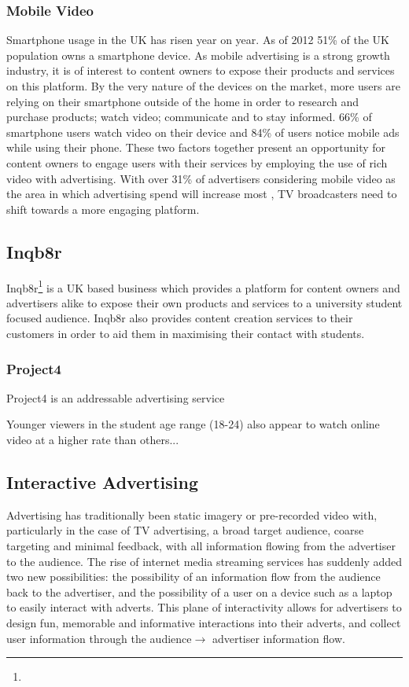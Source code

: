 	\subsubsection{Mobile Video}

	Smartphone usage in the UK has risen year on year. As of 2012 51\% of the UK population owns a smartphone device. As mobile advertising is a strong growth industry, it is of interest to content owners to expose their products and services on this platform. By the very nature of the devices on the market, more users are relying on their smartphone outside of the home in order to research and purchase products; watch video; communicate and to stay informed. 66\% of smartphone users watch video on their device and 84\% of users notice mobile ads while using their phone. \citep{mobile-planet} These two factors together present an opportunity for content owners to engage users with their services by employing the use of rich video with advertising. With over 31\% of advertisers considering mobile video as the area in which advertising spend will increase most \citep{brightroll-report}, TV broadcasters need to shift towards a more engaging platform.


	\subsection{Inqb8r}

	Inqb8r\footnote{} is a UK based business which provides a platform for content owners and advertisers alike to expose their own products and services to a university student focused audience. Inqb8r also provides content creation services to their customers in order to aid them in maximising their contact with students.

	\subsubsection{Project4}

	Project4 is an addressable advertising service

	Younger viewers in the student age range (18-24) also appear to watch online video at a higher rate than others...


	\subsection{Interactive Advertising}

	Advertising has traditionally been static imagery or pre-recorded video with, particularly in the case of TV advertising, a broad target audience, coarse targeting and minimal feedback, with all information flowing from the advertiser to the audience. The rise of internet media streaming services has suddenly added two new possibilities: the possibility of an information flow from the audience back to the advertiser, and the possibility of a user on a device such as a laptop to easily interact with adverts. This plane of interactivity allows for advertisers to design fun, memorable and informative interactions into their adverts, and collect user information through the audience$\rightarrow$ advertiser information flow.

